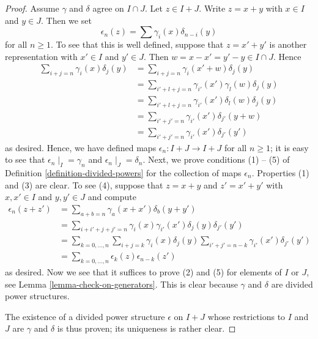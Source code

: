 \documentclass{stacks-project}
\theoremstyle{plain}
\theoremstyle{definition}
\theoremstyle{remark}
\numberwithin{equation}{subsection}
\begin{document}
\begin{proof}
\medskip\noindent
Assume $\gamma$ and $\delta$ agree on $I \cap J$.
Let $z \in I + J$. Write $z = x + y$ with $x \in I$ and $y \in J$.
Then we set
$$
\epsilon_n(z) = \sum \gamma_i(x)\delta_{n - i}(y)
$$
for all $n \geq 1$.
To see that this is well defined, suppose that $z = x' + y'$ is another
representation with $x' \in I$ and $y' \in J$. Then
$w = x - x' = y' - y \in I \cap J$. Hence
\begin{align*}
\sum\nolimits_{i + j = n} \gamma_i(x)\delta_j(y)
& =
\sum\nolimits_{i + j = n} \gamma_i(x' + w)\delta_j(y) \\
& =
\sum\nolimits_{i' + l + j = n} \gamma_{i'}(x')\gamma_l(w)\delta_j(y) \\
& =
\sum\nolimits_{i' + l + j = n} \gamma_{i'}(x')\delta_l(w)\delta_j(y) \\
& =
\sum\nolimits_{i' + j' = n} \gamma_{i'}(x')\delta_{j'}(y + w) \\
& =
\sum\nolimits_{i' + j' = n} \gamma_{i'}(x')\delta_{j'}(y')
\end{align*}
as desired. Hence, we have defined maps
$\epsilon_n : I + J \to I + J$ for all $n \geq 1$; it is easy
to see that $\epsilon_n \mid_{I} = \gamma_n$ and
$\epsilon_n \mid_{J} = \delta_n$.
Next, we prove conditions (1) -- (5) of
Definition \ref{definition-divided-powers} for the collection
of maps $\epsilon_n$.
Properties (1) and (3) are clear. To see (4), suppose
that $z = x + y$ and $z' = x' + y'$ with $x, x' \in I$ and $y, y' \in J$
and compute
\begin{align*}
\epsilon_n(z + z') & =
\sum\nolimits_{a + b = n} \gamma_a(x + x')\delta_b(y + y') \\
& =
\sum\nolimits_{i + i' + j + j' = n}
\gamma_i(x) \gamma_{i'}(x')\delta_j(y)\delta_{j'}(y') \\
& =
\sum\nolimits_{k = 0, \ldots, n}
\sum\nolimits_{i+j=k} \gamma_i(x)\delta_j(y)
\sum\nolimits_{i'+j'=n-k} \gamma_{i'}(x')\delta_{j'}(y') \\
& =
\sum\nolimits_{k = 0, \ldots, n}\epsilon_k(z)\epsilon_{n-k}(z')
\end{align*}
as desired. Now we see that it suffices to prove (2) and (5) for
elements of $I$ or $J$, see Lemma \ref{lemma-check-on-generators}.
This is clear because $\gamma$ and $\delta$ are divided power
structures.

\medskip\noindent
The existence of a divided power structure $\epsilon$ on $I+J$
whose restrictions to $I$ and $J$ are $\gamma$ and $\delta$ is
thus proven; its uniqueness is rather clear.
\end{proof}
\end{document}
